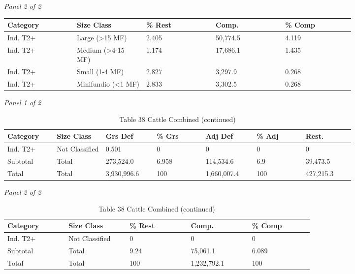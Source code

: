 \documentclass[12pt]{article}
\begin{document}
\begin{landscape}
\begin{table}[H]
\textit{Panel 2 of 2}\\[2pt]
{\fontsize{12}{14}\selectfont
\setlength{\tabcolsep}{3pt}
\renewcommand{\arraystretch}{1.08}
\begin{tabular}{p{0.164\linewidth}p{0.164\linewidth}p{0.164\linewidth}p{0.164\linewidth}p{0.164\linewidth}}
\toprule
Category & Size Class & \% Rest & Comp. & \% Comp \\
\midrule
Ind. T2+ & Large (>15 MF) & 2.405 & 50,774.5 & 4.119 \\
Ind. T2+ & Medium (>4-15 MF) & 1.174 & 17,686.1 & 1.435 \\
Ind. T2+ & Small (1-4 MF) & 2.827 & 3,297.9 & 0.268 \\
Ind. T2+ & Minifundio (<1 MF) & 2.833 & 3,302.5 & 0.268 \\
\bottomrule
\end{tabular}
}
\end{table}
\begin{table}[H]
\centering
\caption{Table 38 Cattle Combined (continued)}
\textit{Panel 1 of 2}\\[2pt]
{\fontsize{12}{14}\selectfont
\setlength{\tabcolsep}{3pt}
\renewcommand{\arraystretch}{1.08}
\begin{tabular}{p{0.117\linewidth}p{0.117\linewidth}p{0.117\linewidth}p{0.117\linewidth}p{0.117\linewidth}p{0.117\linewidth}p{0.117\linewidth}}
\toprule
Category & Size Class & Grs Def & \% Grs & Adj Def & \% Adj & Rest. \\
\midrule
Ind. T2+ & Not Classified & 0.501 & 0 & 0 & 0 & 0 \\
Subtotal & Total & 273,524.0 & 6.958 & 114,534.6 & 6.9 & 39,473.5 \\
Total & Total & 3,930,996.6 & 100 & 1,660,007.4 & 100 & 427,215.3 \\
\bottomrule
\end{tabular}
}

\vspace{0.6em}

\textit{Panel 2 of 2}\\[2pt]
{\fontsize{12}{14}\selectfont
\setlength{\tabcolsep}{3pt}
\renewcommand{\arraystretch}{1.08}
\begin{tabular}{p{0.164\linewidth}p{0.164\linewidth}p{0.164\linewidth}p{0.164\linewidth}p{0.164\linewidth}}
\toprule
Category & Size Class & \% Rest & Comp. & \% Comp \\
\midrule
Ind. T2+ & Not Classified & 0 & 0 & 0 \\
Subtotal & Total & 9.24 & 75,061.1 & 6.089 \\
Total & Total & 100 & 1,232,792.1 & 100 \\
\bottomrule
\end{tabular}
}
\end{table}
\end{landscape}
\end{document}
